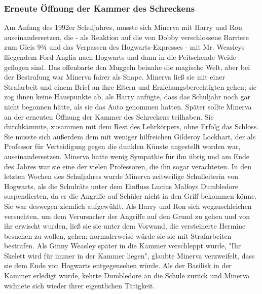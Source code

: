 \documentclass[a4paper, 10pt]{article}
\begin{document}
\subsubsection*{\large Erneute Öffnung der Kammer des Schreckens}
Am Anfang des 1992er Schuljahres, musste sich Minerva mit Harry und Ron auseinandersetzen, die - als Reaktion auf die von Dobby verschlossene Barriere zum Gleis 9¾ und das Verpassen des Hogwarts-Expresses - mit Mr. Weasleys fliegendem Ford Anglia nach Hogwarts und dann in die Peitschende Weide geflogen sind. Das offenbarte den Muggeln beinahe die magische Welt, aber bei der Bestrafung war Minerva fairer als Snape. Minerva ließ sie mit einer Strafarbeit und einem Brief an ihre Eltern und Erziehungsberechtigten gehen; sie zog ihnen keine Hauspunkte ab, als Harry anfügte, dass das Schuljahr noch gar nicht begonnen hätte, als sie das Auto genommen hatten.
\vspace{10pt}
\newline
Später sollte Minerva an der erneuten Öffnung der Kammer des Schreckens teilhaben. Sie durchkämmte, zusammen mit dem Rest des Lehrkörpers, ohne Erfolg das Schloss. Sie musste sich außerdem dem mit weniger hilfreichen Gilderoy Lockhart, der als Professor für Verteidigung gegen die dunklen Künste angestellt worden war, auseinandersetzen. Minerva hatte wenig Sympathie für ihn übrig und am Ende des Jahres war sie eine der vielen Professoren, die ihn sogar verachteten.
\vspace{10pt}
\newline
In den letzten Wochen des Schuljahres wurde Minerva zeitweilige Schulleiterin von Hogwarts, als die Schulräte unter dem Einfluss Lucius Malfoys Dumbledore suspendierten, da er die Angriffe auf Schüler nicht in den Griff bekommen könne. Sie war deswegen ziemlich aufgewühlt. Als Harry und Ron sich wegzuschleichen versuchten, um dem Verursacher der Angriffe auf den Grund zu gehen und von ihr erwischt wurden, ließ sie sie unter dem Vorwand, die versteinerte Hermine besuchen zu wollen, gehen; normalerweise würde sie sie mit Strafarbeiten bestrafen. Als Ginny Weasley später in die Kammer verschleppt wurde, "Ihr Skelett wird für immer in der Kammer liegen", glaubte Minerva verzweifelt, dass sie dem Ende von Hogwarts entgegensehen würde. Als der Basilisk in der Kammer erledigt wurde, kehrte Dumbledore an die Schule zurück und Minerva widmete sich wieder ihrer eigentlichen Tätigkeit.
\end{document}
